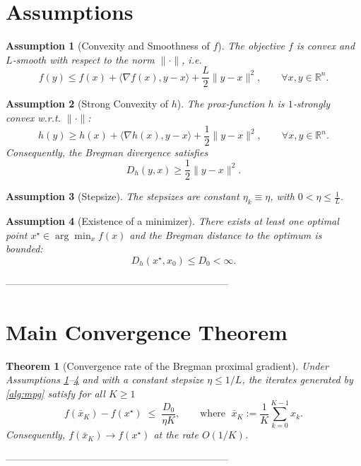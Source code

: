 \documentclass{article}
\newtheorem{theorem}{Theorem}
\newtheorem{assumption}{Assumption}
\newcommand{\R}{\mathbb{R}}
\newcommand{\inner}[2]{\langle #1,#2\rangle}
\newcommand{\Breg}[2]{D_{h}(#1,#2)}
\newcommand{\grad}{\nabla}
\begin{document}
\section*{Assumptions}
\begin{assumption}[Convexity and Smoothness of $f$]\label{as:convex}
The objective $f$ is convex and $L$‑smooth with respect to the norm $\|\cdot\|$, i.e.
\[
f(y)\le f(x)+\inner{\grad f(x)}{y-x}+\frac{L}{2}\|y-x\|^{2},
\qquad\forall x,y\in\R^{n}.
\tag{4}
\]
\end{assumption}

\begin{assumption}[Strong Convexity of $h$]\label{as:hsc}
The prox‑function $h$ is $1$‑strongly convex w.r.t. $\|\cdot\|$:
\[
h(y)\ge h(x)+\inner{\grad h(x)}{y-x}+\frac12\|y-x\|^{2},
\qquad\forall x,y\in\R^{n}.
\tag{5}
\]
Consequently, the Bregman divergence satisfies
\[
\Breg{y}{x}\ge \frac12\|y-x\|^{2}.
\tag{6}
\]
\end{assumption}

\begin{assumption}[Stepsize]\label{as:stepsize}
The stepsizes are constant $\eta_{k}\equiv\eta$, with $0<\eta\le \frac{1}{L}$.
\end{assumption}

\begin{assumption}[Existence of a minimizer]\label{as:min}
There exists at least one optimal point $x^{\star}\in\arg\min_{x}f(x)$ and the Bregman distance to the optimum is bounded:
\[
\Breg{x^{\star}}{x_{0}}\le D_{0}<\infty .
\tag{7}
\]
\end{assumption}

--------------------------------------------------------------------

\section*{Main Convergence Theorem}
\begin{theorem}[Convergence rate of the Bregman proximal gradient]\label{thm:conv}
Under Assumptions \ref{as:convex}–\ref{as:min} and with a constant stepsize $\eta\le 1/L$, the iterates generated by \eqref{alg:mpg} satisfy for all $K\ge 1$  
\[
f(\bar{x}_{K})-f(x^{\star})
\;\le\;
\frac{D_{0}}{\eta K},
\qquad\text{where }\;
\bar{x}_{K}:=\frac{1}{K}\sum_{k=0}^{K-1}x_{k}.
\tag{8}
\]
Consequently, $f(\bar{x}_{K})\to f(x^{\star})$ at the rate $O(1/K)$.
\end{theorem}

--------------------------------------------------------------------
\end{document}
